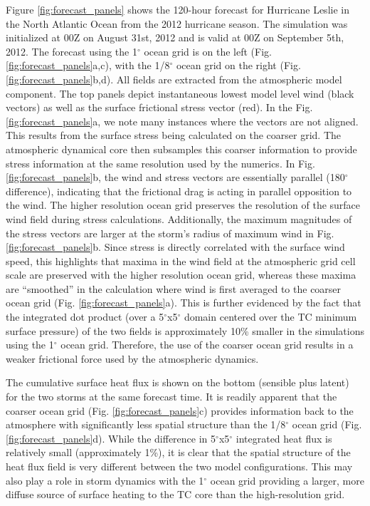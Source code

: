 \documentclass[draft,ms]{AGUTeX}
\newcommand{\degree}{$^{\circ}$}
\begin{document}
\begin{article}
Figure \ref{fig:forecast_panels} shows the 120-hour forecast for Hurricane Leslie in the North Atlantic Ocean from the 2012 hurricane season. The simulation was initialized at 00Z on August 31st, 2012 and is valid at 00Z on September 5th, 2012. The forecast using the 1\degree{} ocean grid is on the left (Fig. \ref{fig:forecast_panels}a,c), with the 1/8\degree{} ocean grid on the right (Fig. \ref{fig:forecast_panels}b,d). All fields are extracted from the atmospheric model component. The top panels depict instantaneous lowest model level wind (black vectors) as well as the surface frictional stress vector (red). In the Fig. \ref{fig:forecast_panels}a, we note many instances where the vectors are not aligned. This results from the surface stress being calculated on the coarser grid. The atmospheric dynamical core then subsamples this coarser information to provide stress information at the same resolution used by the numerics. In Fig. \ref{fig:forecast_panels}b, the wind and stress vectors are essentially parallel (180\degree{} difference), indicating that the frictional drag is acting in parallel opposition to the wind. The higher resolution ocean grid preserves the resolution of the surface wind field during stress calculations. Additionally, the maximum magnitudes of the stress vectors are larger at the storm's radius of maximum wind in Fig. \ref{fig:forecast_panels}b. Since stress is directly correlated with the surface wind speed, this highlights that maxima in the wind field at the atmospheric grid cell scale are preserved with the higher resolution ocean grid, whereas these maxima are ``smoothed'' in the calculation where wind is first averaged to the coarser ocean grid (Fig. \ref{fig:forecast_panels}a). This is further evidenced by the fact that the integrated dot product (over a 5\degree{}x5\degree{} domain centered over the TC minimum surface pressure) of the two fields is approximately 10\% smaller in the simulations using the 1\degree{} ocean grid. Therefore, the use of the coarser ocean grid results in a weaker frictional force used by the atmospheric dynamics.

The cumulative surface heat flux is shown on the bottom (sensible plus latent) for the two storms at the same forecast time. It is readily apparent that the coarser ocean grid (Fig. \ref{fig:forecast_panels}c) provides information back to the atmosphere with significantly less spatial structure than the 1/8\degree{} ocean grid (Fig. \ref{fig:forecast_panels}d). While the difference in 5\degree{}x5\degree{} integrated heat flux is relatively small (approximately 1\%), it is clear that the spatial structure of the heat flux field is very different between the two model configurations. This may also play a role in storm dynamics with the 1\degree{} ocean grid providing a larger, more diffuse source of surface heating to the TC core than the high-resolution grid.


\end{article}
\end{document}
